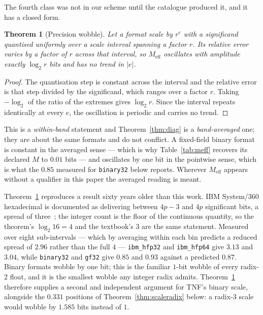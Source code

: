 \documentclass[11pt]{article}
\newtheorem{theorem}{Theorem}
\theoremstyle{definition}
\begin{document}
The fourth class was not in our scheme until the catalogue produced it, and it has
a closed form.

\begin{theorem}[Precision wobble]
\label{thm:wobble}
Let a format scale by $r^{e}$ with a significand quantised uniformly over a
scale interval spanning a factor $r$. Its relative error varies by a factor of
$r$ across that interval, so $M_{\mathrm{eff}}$ oscillates with amplitude exactly
$\log_2 r$ bits and has no trend in $|e|$.
\end{theorem}

\begin{proof}
The quantisation step is constant across the interval and the relative error is
that step divided by the significand, which ranges over a factor $r$. Taking
$-\log_2$ of the ratio of the extremes gives $\log_2 r$. Since the interval
repeats identically at every $e$, the oscillation is periodic and carries no
trend.
\end{proof}

This is a \emph{within-band} statement and Theorem~\ref{thm:diag} is a
\emph{band-averaged} one; they are about the same formats and do not conflict.
A fixed-field binary format is constant in the averaged sense --- which is why
Table~\ref{tab:meff} recovers its declared $M$ to $0.01$ bits --- and oscillates by
one bit in the pointwise sense, which is what the $0.85$ measured for
\texttt{binary32} below reports. Wherever $M_{\mathrm{eff}}$ appears without a
qualifier in this paper the averaged reading is meant.

Theorem~\ref{thm:wobble} reproduces a result sixty years older than this work.
IBM System/360 hexadecimal is documented as delivering between $4p-3$ and $4p$
significant bits, a spread of three~\cite{goldberg1991,ibmhfp}; the integer count
is the floor of the continuous quantity, so the theorem's $\log_2 16 = 4$ and the
textbook's $3$ are the same statement. Measured over eight sub-intervals ---
which by averaging within each bin predicts a reduced spread of $2.96$ rather than
the full $4$ --- \texttt{ibm\_hfp32} and \texttt{ibm\_hfp64} give $3.13$ and
$3.04$, while \texttt{binary32} and \texttt{gf32} give $0.85$ and $0.93$ against a
predicted $0.87$. Binary formats wobble by one bit; this is the familiar
$1$-bit wobble of every radix-2 float, and it is the smallest wobble any integer
radix admits. Theorem~\ref{thm:wobble} therefore supplies a second and independent
argument for TNF's binary scale, alongside the $0.331$ positions of
Theorem~\ref{thm:scaleradix} below: a radix-3 scale would wobble by $1.585$ bits
instead of $1$.
\end{document}
